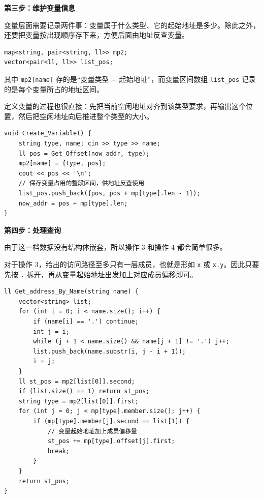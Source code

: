 \documentclass{book}
\newcommand{\code}[1]{\colorbox{codebg}{\texttt{#1}}}  %
\begin{document}
    \par\medskip
    \noindent\textbf{第三步：维护变量信息}
    \par\medskip

    变量层面需要记录两件事：变量属于什么类型、它的起始地址是多少。除此之外，还要把变量按出现顺序存下来，方便后面由地址反查变量。

    \begin{lstlisting}[style = code]
map<string, pair<string, ll>> mp2;
vector<pair<ll, ll>> list_pos;\end{lstlisting}

    其中 \code{mp2[name]} 存的是“变量类型 + 起始地址”，而变量区间数组 \code{list\_pos} 记录的是每个变量所占的地址区间。

    定义变量的过程也很直接：先把当前空闲地址对齐到该类型要求，再输出这个位置，然后把空闲地址向后推进整个类型的大小。
\newpage
    \begin{lstlisting}[style = code]
void Create_Variable() {
    string type, name; cin >> type >> name;
    ll pos = Get_Offset(now_addr, type);
    mp2[name] = {type, pos};
    cout << pos << '\n';
    // 保存变量占用的整段区间，供地址反查使用
    list_pos.push_back({pos, pos + mp[type].len - 1});
    now_addr = pos + mp[type].len;
}\end{lstlisting}

    \par\medskip
    \noindent\textbf{第四步：处理查询}
    \par\medskip

    由于这一档数据没有结构体嵌套，所以操作 $3$ 和操作 $4$ 都会简单很多。

    对于操作 $3$，给出的访问路径至多只有一层成员，也就是形如 \code{x} 或 \code{x.y}。因此只要先按 \code{.} 拆开，再从变量起始地址出发加上对应成员偏移即可。

    \begin{lstlisting}[style = code]
ll Get_address_By_Name(string name) {
    vector<string> list;
    for (int i = 0; i < name.size(); i++) {
        if (name[i] == '.') continue;
        int j = i;
        while (j + 1 < name.size() && name[j + 1] != '.') j++;
        list.push_back(name.substr(i, j - i + 1));
        i = j;
    }
    ll st_pos = mp2[list[0]].second;
    if (list.size() == 1) return st_pos;
    string type = mp2[list[0]].first;
    for (int j = 0; j < mp[type].member.size(); j++) {
        if (mp[type].member[j].second == list[1]) {
            // 变量起始地址加上成员偏移量
            st_pos += mp[type].offset[j].first;
            break;
        }
    }
    return st_pos;
}\end{lstlisting}
\end{document}
